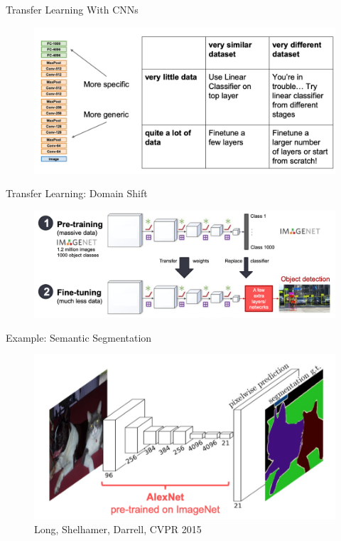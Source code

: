 \documentclass[serif, aspectratio=169]{beamer}
\begin{document}
\begin{frame}{Transfer Learning With CNNs}
	\begin{figure}[htpb]
		\begin{center}
			\includegraphics[keepaspectratio, scale=0.25]{pic/TL_cnn3}
		\end{center}
	\end{figure}
\end{frame}

\begin{frame}{Transfer Learning: Domain Shift}
	\begin{figure}[htpb]
		\begin{center}
			\includegraphics[keepaspectratio, scale=0.25]{pic/TL_domain_change}
		\end{center}
	\end{figure}
\end{frame}

\begin{frame}{Example: Semantic Segmentation}
	\begin{figure}[htpb]
		\begin{center}
			\includegraphics[keepaspectratio, scale=0.25]{pic/sem}
			\caption*{\scriptsize Long, Shelhamer, Darrell, CVPR 2015}
		\end{center}
	\end{figure}
\end{frame}
\end{document}
